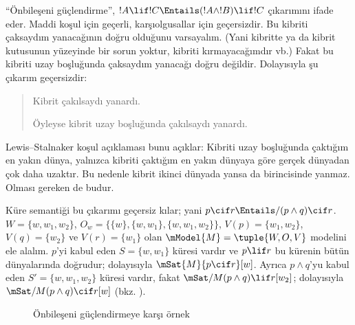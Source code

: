



``Önbileşeni güçlendirme'', $!A\lif !C\Entails(!A\land !B)\lif !C$
çıkarımını ifade eder. Maddi koşul için geçerli, karşıolgusallar için
geçersizdir. Bu kibriti çaksaydım yanacağının doğru olduğunu varsayalım.
(Yani kibritte ya da kibrit kutusunun yüzeyinde bir sorun yoktur, kibriti
kırmayacağımdır vb.) Fakat bu kibriti uzay boşluğunda çaksaydım yanacağı
doğru değildir. Dolayısıyla şu çıkarım geçersizdir:
\begin{quote}
  Kibrit çakılsaydı yanardı.

  Öyleyse kibrit uzay boşluğunda çakılsaydı yanardı.
\end{quote}

Lewis--Stalnaker koşul açıklaması bunu açıklar: Kibriti uzay boşluğunda
çaktığım en yakın dünya, yalnızca kibriti çaktığım en yakın dünyaya göre
gerçek dünyadan çok daha uzaktır. Bu nedenle kibrit ikinci dünyada yansa da
birincisinde yanmaz. Olması gereken de budur.

\begin{ex}
  Küre semantiği bu çıkarımı geçersiz kılar; yani
  $p\cif r\Entails/(p\land q)\cif r$. $W=\{w,w_1,w_2\}$,
  $O_w=\{\{w\},\{w,w_1\},\{w,w_1,w_2\}\}$,
  $V(p)=\{w_1,w_2\}$, $V(q)=\{w_2\}$ ve $V(r)=\{w_1\}$ olan
  $\mModel{M}=\tuple{W,O,V}$ modelini ele alalım. $p$'yi kabul eden
  $S=\{w,w_1\}$ küresi vardır ve $p\lif r$ bu kürenin bütün dünyalarında
  doğrudur; dolayısıyla $\mSat{M}{p\cif r}[w]$. Ayrıca $p\land q$'yu kabul
  eden $S'=\{w,w_1,w_2\}$ küresi vardır, fakat
  $\mSat/{M}{(p\land q)\lif r}[w_2]$; dolayısıyla
  $\mSat/{M}{(p\land q)\cif r}[w]$
  (bkz. ).

\begin{figure}
\begin{center}
\caption{Önbileşeni güçlendirmeye karşı örnek}
\end{center}
\end{figure}
\end{ex}

